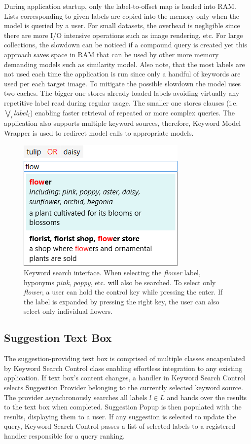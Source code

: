 During application startup, only the label-to-offset map is loaded into RAM. Lists corresponding to given labels are copied into the memory only when the model is queried by a user. For small datasets, the overhead is negligible since there are more I/O intensive operations such as image rendering, etc. For large collections, the slowdown can be noticed if a compound query is created yet this approach saves space in RAM that can be used by other more memory demanding models such as similarity model. Also note, that the most labels are not used each time the application is run since only a handful of keywords are used per each target image. To mitigate the possible slowdown the model uses two caches. The bigger one stores already loaded labels avoiding virtually any repetitive label read during regular usage. The smaller one stores clauses (i.e. $\bigvee_i label_i$) enabling faster retrieval of repeated or more complex queries. The application also supports multiple keyword sources, therefore, Keyword Model Wrapper is used to redirect model calls to appropriate models.

\begin{figure}[ht]
	\centering
	\includegraphics[scale=0.5]{img/keyword-textbox.png}
	
	\caption[Keyword search interface]{Keyword search interface. When selecting the \textit{flower} label, hyponyms \textit{pink}, \textit{poppy}, etc. will also be searched. To select only \textit{flower}, a user can hold the control key while pressing the enter. If the label is expanded by pressing the right key, the user can also select only individual flowers.}
	\label{fig:keyword-textbox}
\end{figure}

\subsection{Suggestion Text Box}
The suggestion-providing text box is comprised of multiple classes encapsulated by Keyword Search Control class enabling effortless integration to any existing application. If text box's content changes, a handler in Keyword Search Control selects Suggestion Provider belonging to the currently selected keyword source. The provider asynchronously searches all labels $l\in L$ and hands over the results to the text box when completed. Suggestion Popup is then populated with the results, displaying them to a user. If any suggestion is selected to update the query, Keyword Search Control passes a list of selected labels to a registered handler responsible for a query ranking.

